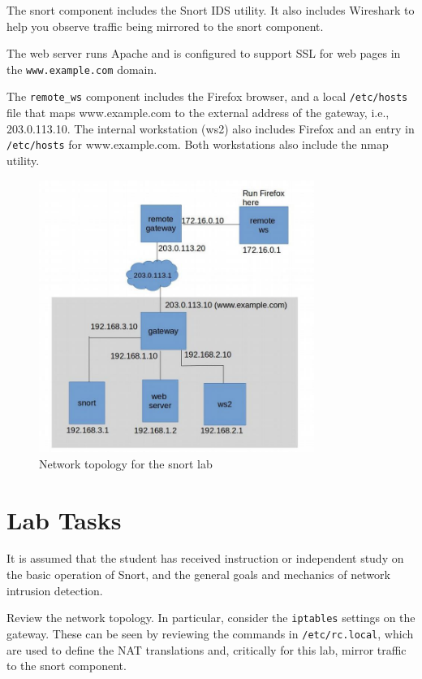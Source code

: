 The snort component includes the Snort IDS utility.  It also includes Wireshark
to help you observe traffic being mirrored to the snort component.

The web server runs Apache and is configured to support SSL for web pages in the
{\tt www.example.com} domain.

The {\tt remote\_ws} component includes the Firefox browser, and a local 
{\tt /etc/hosts} file that maps www.example.com to the external address of the
gateway, i.e., 203.0.113.10.  The internal workstation (ws2) also includes Firefox
and an entry in {\tt /etc/hosts} for www.example.com.  Both workstations also
include the nmap utility.


\begin{figure}[htb]
\begin{center}
\includegraphics [width=0.8\textwidth,natwidth=621,natheight=403]{snort.jpg}
\end{center}
\caption{Network topology for the snort lab}
\label{fig:topology}
\end{figure}

\section{Lab Tasks}
It is assumed that the student has received instruction or independent study on
the basic operation of Snort, and the general goals and mechanics of network intrusion detection.

Review the network topology.  In particular, consider the {\tt iptables} settings on the gateway.
These can be seen by reviewing the commands in {\tt /etc/rc.local}, which are used to
define the NAT translations and, critically for this lab, mirror traffic to the snort component. 


